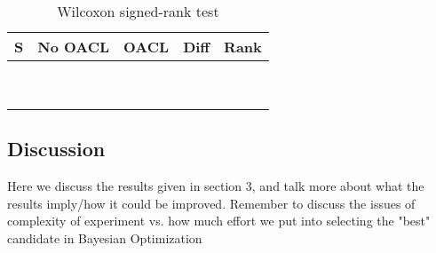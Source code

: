 \begin{table}[H]
	\centering
	\caption{Wilcoxon signed-rank test}
	\label{fig:wilcoxon}
	\begin{tabular}{@{}l|llll@{}}
		\toprule
		S & No OACL & OACL & Diff & Rank \\ \midrule
		&               &                 &      &      \\
		&               &                 &      &      \\
		&               &                 &      &      \\
		&               &                 &      &      \\
		&               &                 &      &      \\
		&               &                 &      &      \\
		&               &                 &      &      \\
		&               &                 &      &      \\
		&               &                 &      &      \\ \bottomrule
	\end{tabular}
\end{table}

\subsection{Discussion}
Here we discuss the results given in section 3, and talk more about what the results imply/how it could be improved.
Remember to discuss the issues of complexity of experiment vs. how much effort we put into selecting the "best" candidate in Bayesian Optimization